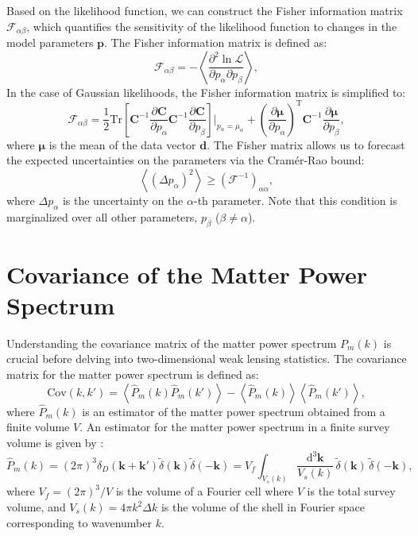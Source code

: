 Based on the likelihood function, we can construct the Fisher information matrix $\mathcal{F}_{\alpha\beta}$, which quantifies the sensitivity of the likelihood function to changes in the model parameters $\mathbf{p}$. The Fisher information matrix is defined as:
\begin{equation}
    \mathcal{F}_{\alpha\beta} = -\left\langle \frac{\partial^2 \ln \mathcal{L}}{\partial p_\alpha \partial p_\beta} \right\rangle,
\end{equation}
In the case of Gaussian likelihoods, the Fisher information matrix is simplified to:
\begin{equation}
    \mathcal{F}_{\alpha\beta} = \frac{1}{2} \mathrm{Tr} \left[ \mathbf{C}^{-1} \frac{\partial \mathbf{C}}{\partial p_\alpha} \mathbf{C}^{-1} \frac{\partial \mathbf{C}}{\partial p_\beta} \right]\Bigg|_{p_\alpha = \mu_\alpha} + \left(\frac{\partial \mathbf{\mu}}{\partial p_\alpha}\right)^{\mathrm{T}} \mathbf{C}^{-1} \frac{\partial \mathbf{\mu}}{\partial p_\beta},
\end{equation}
where $\mathbf{\mu}$ is the mean of the data vector $\mathbf{d}$. The Fisher matrix allows us to forecast the expected uncertainties on the parameters via the Cramér-Rao bound:
\begin{equation}
    \left\langle (\Delta p_\alpha)^2 \right\rangle \geq (\mathcal{F}^{-1})_{\alpha\alpha},
\end{equation}
where $\Delta p_\alpha$ is the uncertainty on the $\alpha$-th parameter. Note that this condition is marginalized over all other parameters, $p_\beta$ ($\beta \neq \alpha$).

\section{Covariance of the Matter Power Spectrum}
Understanding the covariance matrix of the matter power spectrum \( P_m(k) \) is crucial before delving into two-dimensional weak lensing statistics. 
The covariance matrix for the matter power spectrum is defined as:
\begin{equation}
    \mathrm{Cov}(k, k') = \left\langle \hat{P}_m(k) \hat{P}_m(k') \right\rangle - \left\langle \hat{P}_m(k) \right\rangle \left\langle \hat{P}_m(k') \right\rangle,
\end{equation}
where \( \hat{P}_m(k) \) is an estimator of the matter power spectrum obtained from a finite volume \( V \).
An estimator for the matter power spectrum in a finite survey volume is given by \citep{1994ApJ...426...23F}:
\begin{equation}
    \hat{P}_m(k) = (2\pi)^3 \delta_D(\mathbf{k} + \mathbf{k'}) \tilde{\delta}(\mathbf{k}) \tilde{\delta}(-\mathbf{k}) = V_f \int_{V_s(k)} \frac{\mathrm{d}^3 \mathbf{k}}{V_s(k)} \, \tilde{\delta}(\mathbf{k}) \, \tilde{\delta}(-\mathbf{k}),
\end{equation}
where $V_f = (2\pi)^3 / V$ is the volume of a Fourier cell where $V$ is the total survey volume, and $V_s(k) = 4\pi k^2 \Delta k$ is the volume of the shell in Fourier space corresponding to wavenumber \( k \).

